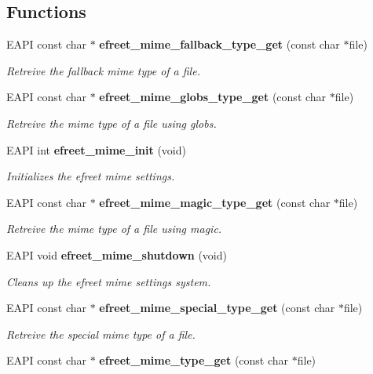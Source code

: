 \subsection*{Functions}
\begin{CompactItemize}
\item 
EAPI const char $\ast$ {\bf efreet\_\-mime\_\-fallback\_\-type\_\-get} (const char $\ast$file)
\begin{CompactList}\small\item\em Retreive the fallback mime type of a file. \item\end{CompactList}\item 
EAPI const char $\ast$ {\bf efreet\_\-mime\_\-globs\_\-type\_\-get} (const char $\ast$file)
\begin{CompactList}\small\item\em Retreive the mime type of a file using globs. \item\end{CompactList}\item 
EAPI int {\bf efreet\_\-mime\_\-init} (void)
\begin{CompactList}\small\item\em Initializes the efreet mime settings. \item\end{CompactList}\item 
EAPI const char $\ast$ {\bf efreet\_\-mime\_\-magic\_\-type\_\-get} (const char $\ast$file)
\begin{CompactList}\small\item\em Retreive the mime type of a file using magic. \item\end{CompactList}\item 
EAPI void {\bf efreet\_\-mime\_\-shutdown} (void)
\begin{CompactList}\small\item\em Cleans up the efreet mime settings system. \item\end{CompactList}\item 
EAPI const char $\ast$ {\bf efreet\_\-mime\_\-special\_\-type\_\-get} (const char $\ast$file)
\begin{CompactList}\small\item\em Retreive the special mime type of a file. \item\end{CompactList}\item 
EAPI const char $\ast$ {\bf efreet\_\-mime\_\-type\_\-get} (const char $\ast$file)

\end{CompactItemize}
